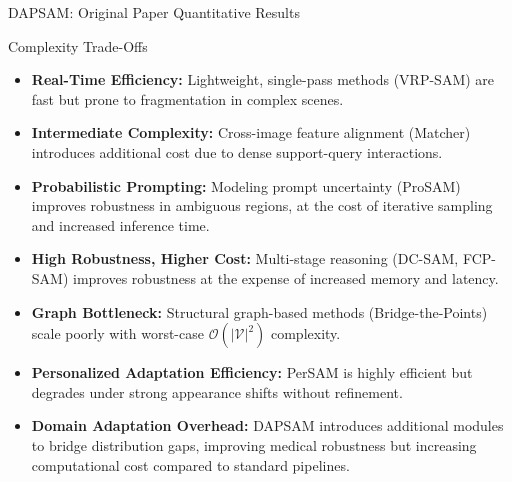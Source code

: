 \documentclass[aspectratio=169, 10pt]{beamer}
\begin{document}
\begin{frame}{DAPSAM: Original Paper Quantitative Results}
    \begin{table}[htbp]
    \centering
    \caption{Domain Generalization on Medical Datasets \cite{wei2024prompting}}
    \end{table}

\end{frame}



\begin{frame}{Complexity Trade-Offs}
    \footnotesize
    \begin{itemize}
        \item \textbf{Real-Time Efficiency:} Lightweight, single-pass methods (VRP-SAM) are fast but prone to fragmentation in complex scenes.
        \item \textbf{Intermediate Complexity:} Cross-image feature alignment (Matcher) introduces additional cost due to dense support-query interactions.
        \item \textbf{Probabilistic Prompting:} Modeling prompt uncertainty (ProSAM) improves robustness in ambiguous regions, at the cost of iterative sampling and increased inference time.
        \item \textbf{High Robustness, Higher Cost:} Multi-stage reasoning (DC-SAM, FCP-SAM) improves robustness at the expense of increased memory and latency.
        \item \textbf{Graph Bottleneck:} Structural graph-based methods (Bridge-the-Points) scale poorly with worst-case $\mathcal{O}(|\mathcal{V}|^2)$ complexity.
        \item \textbf{Personalized Adaptation Efficiency:} PerSAM is highly efficient but degrades under strong appearance shifts without refinement.
        \item \textbf{Domain Adaptation Overhead:} DAPSAM introduces additional modules to bridge distribution gaps, improving medical robustness but increasing computational cost compared to standard pipelines.
    \end{itemize}
\end{frame}
\end{document}
